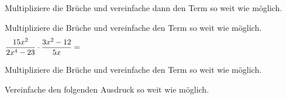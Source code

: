 \documentclass[11pt]{exam}
\begin{document}
\begin{questions}
\question[6]
Multipliziere die Brüche und vereinfache dann den Term so weit wie möglich.

\question[3]
Multipliziere die Brüche und vereinfache den Term so weit wie möglich.
\[\frac{15x^2}{2x^4-23}\*\frac{3x^2-12}{5x}=\hspace{10cm}\] %

\question[4]
Multipliziere die Brüche und vereinfache den Term so weit wie möglich.

\question[4]
Vereinfache den folgenden Ausdruck so weit wie möglich.



\end{questions}
\end{document}
